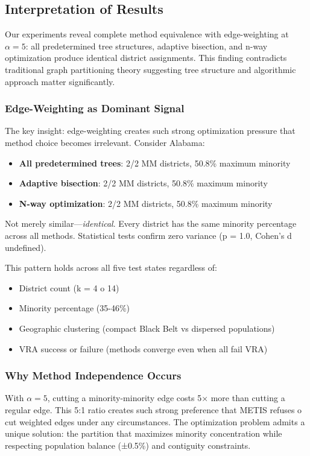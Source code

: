 \subsection{Interpretation of Results}

Our experiments reveal complete method equivalence with edge-weighting at $\alpha = 5$: all predetermined tree structures, adaptive bisection, and n-way optimization produce identical district assignments. This finding contradicts traditional graph partitioning theory suggesting tree structure and algorithmic approach matter significantly.

\subsubsection{Edge-Weighting as Dominant Signal}

The key insight: edge-weighting creates such strong optimization pressure that method choice becomes irrelevant. Consider Alabama:
\begin{itemize}
\item \textbf{All predetermined trees}: 2/2 MM districts, 50.8\% maximum minority
\item \textbf{Adaptive bisection}: 2/2 MM districts, 50.8\% maximum minority
\item \textbf{N-way optimization}: 2/2 MM districts, 50.8\% maximum minority
\end{itemize}

Not merely similar—\textit{identical}. Every district has the same minority percentage across all methods. Statistical tests confirm zero variance (p = 1.0, Cohen's d undefined).

This pattern holds across all five test states regardless of:
\begin{itemize}
\item District count (k = 4 	o 14)
\item Minority percentage (35-46\%)
\item Geographic clustering (compact Black Belt vs dispersed populations)
\item VRA success or failure (methods converge even when all fail VRA)
\end{itemize}

\subsubsection{Why Method Independence Occurs}

With $\alpha = 5$, cutting a minority-minority edge costs 5× more than cutting a regular edge. This 5:1 ratio creates such strong preference that METIS refuses 	o cut weighted edges under any circumstances. The optimization problem admits a unique solution: the partition that maximizes minority concentration while respecting population balance (±0.5\%) and contiguity constraints.

